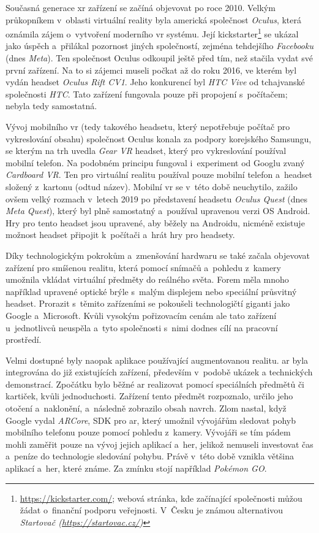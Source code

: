 Současná generace \gls{xr} zařízení se začíná objevovat po roce 2010. Velkým průkopníkem v~oblasti virtuální reality byla americká společnost \textit{Oculus}, která oznámila zájem o~vytvoření moderního \gls{vr} systému. Její kickstarter\footnote{\url{https://kickstarter.com/}; webová stránka, kde začínající společnosti můžou žádat o~finanční podporu veřejnosti. V~Česku je známou alternativou \em Startovač (\url{https://startovac.cz/})} se ukázal jako úspěch a~přilákal pozornost jiných společností, zejména tehdejšího \textit{Facebooku} (dnes \textit{Meta}). Ten společnost Oculus odkoupil ještě před tím, než stačila vydat své první zařízení. Na to si zájemci museli počkat až do roku 2016, ve kterém byl vydán headset \textit{Oculus Rift CV1}. Jeho konkurencí byl \textit{HTC Vive} od tchajvanské společnosti \textit{HTC}. Tato zařízení fungovala pouze při propojení s~počítačem; nebyla tedy samostatná. \cite{otechnice_3}

Vývoj mobilního \gls{vr} (tedy takového headsetu, který nepotřebuje počítač pro vykreslování obsahu) společnost Oculus konala za podpory korejského Samsungu, se kterým na trh uvedla \textit{Gear VR} \poml headset, který pro vykreslování používal mobilní telefon. Na podobném principu fungoval i~experiment od Googlu zvaný \textit{Cardboard VR}. Ten pro virtuální realitu používal pouze mobilní telefon a~headset složený z~kartonu (odtud název). Mobilní \gls{vr} se v~této době neuchytilo, zažilo ovšem velký rozmach v~letech 2019 po představení headsetu \textit{Oculus Quest} (dnes \textit{Meta Quest}), který byl plně samostatný a~používal upravenou verzi OS Android. Hry pro tento headset jsou upravené, aby běžely na Androidu, nicméně existuje možnost headset připojit k~počítači a~hrát hry pro  headsety. \cite{otechnice_3}

Díky technologickým pokrokům a~zmenšování hardwaru se také začala objevovat zařízení pro smíšenou realitu, která pomocí snímačů a~pohledu z~kamery umožnila vkládat virtuální předměty do reálného světa. Forem měla mno\-ho \poml například upravené optické brýle s~malým displejem nebo speciální průsvitný headset. Prorazit s~těmito zařízeními se pokoušeli technologičtí giganti jako Google a~Microsoft. Kvůli vysokým pořizovacím cenám ale tato zařízení u~jednotlivců neuspěla a~tyto společnosti s~nimi dodnes cílí na pracovní prostředí. \cite{google_glass_mobilenet}

Velmi dostupné byly naopak aplikace používající augmentovanou realitu. \gls{ar} byla integrována do již existujících zařízení, především v~podobě ukázek a technických demonstrací. Zpočátku bylo běžné \gls{ar} realizovat pomocí speciálních předmětů či kartiček, kvůli jednoduchosti. Zařízení tento předmět rozpoznalo, určilo jeho otočení a~naklonění, a~následně zobrazilo obsah navrch. Zlom nastal, když Google vydal \textit{ARCore}, \gls{SDK} pro \gls{ar}, který umožnil vývojářům sledovat pohyb mobilního telefonu pouze pomocí pohledu z~kamery. Vývojáři se tím pádem mohli zaměřit pouze na vývoj jejich aplikací a~her, jelikož nemuseli investovat čas a~peníze do technologie sledování pohybu. Právě v~této době vznikla většina aplikací a~her, které známe. Za zmínku stojí například \textit{Pokémon GO}. \cite{enwiki:1182789097}

